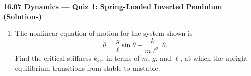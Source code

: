 \documentclass[11pt,letterpaper]{article}
\begin{document}
\begin{center}
    {\Large \textbf{16.07 Dynamics --- Quiz 1: Spring-Loaded Inverted Pendulum (Solutions)}}
\end{center}


\begin{minipage}[t]{0.66\textwidth}


\vspace{14pt}
\begin{enumerate}[label=\textbf{\arabic*.}, leftmargin=*, itemsep=4pt, series=quiz]
\item The nonlinear equation of motion for the system shown is
\[
\ddot\theta = \frac{g}{\ell}\sin\theta - \frac{k}{m\ell^2}\,\theta .
\]
Find the critical stiffness $k_{cr}$, in terms of $m$, $g$, and $\ell$, at which the upright equilibrium transitions from stable to unstable.
\end{enumerate}
\end{minipage}%
\hfill
\end{document}
